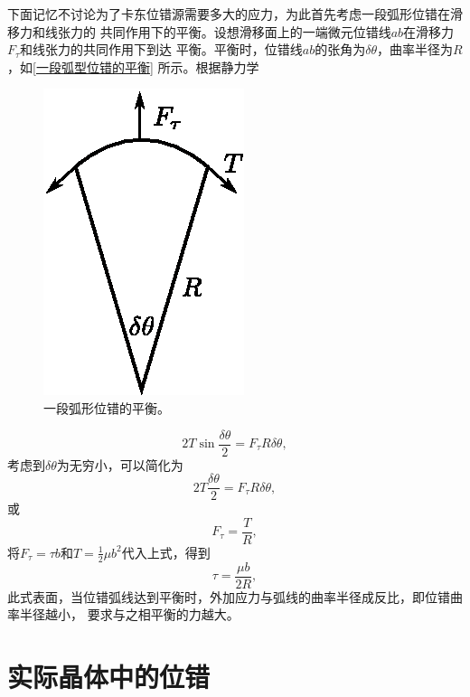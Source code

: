                 下面记忆不讨论为了卡东位错源需要多大的应力，为此首先考虑一段弧形位错在滑移力和线张力的
                共同作用下的平衡。设想滑移面上的一端微元位错线$ab$在滑移力$F_\tau$和线张力的共同作用下到达
                平衡。平衡时，位错线$ab$的张角为$\delta\theta$，曲率半径为$R$，如\autoref{一段弧型位错的平衡}
                所示。根据静力学
                \begin{figure}[ht]
                    \centering
                    \includegraphics[scale=1]{fig/balance_of_FR_source.eps}
                    \caption{一段弧形位错的平衡。}
                    \label{一段弧型位错的平衡}
                \end{figure}
                \begin{equation}
                    2T\sin\frac{\delta\theta}{2}=F_\tau R\delta\theta,
                \end{equation}
                考虑到$\delta\theta$为无穷小，可以简化为
                \begin{equation}
                    2T\frac{\delta\theta}{2}=F_\tau R\delta\theta,
                \end{equation}
                或
                \begin{equation}
                    F_\tau=\frac{T}{R},
                \end{equation}
                将$F_\tau=\tau b$和$T=\frac{1}{2}\mu b^2$代入上式，得到
                \begin{equation}
                    \tau=\frac{\mu b}{2R},
                \end{equation}
                此式表面，当位错弧线达到平衡时，外加应力与弧线的曲率半径成反比，即位错曲率半径越小，
                要求与之相平衡的力越大。
        \section{实际晶体中的位错}
        